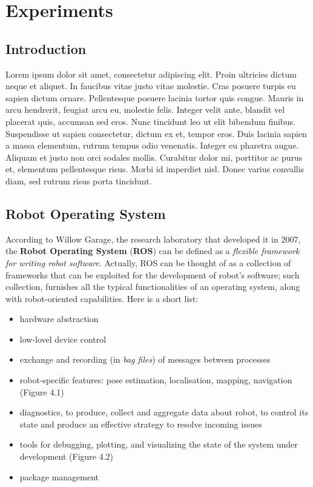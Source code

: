 \documentclass[a4paper, onecolumn]{report}
\begin{document}
\chapter{Experiments}
\section{Introduction}
Lorem ipsum dolor sit amet, consectetur adipiscing elit. Proin ultricies dictum neque et aliquet. In faucibus vitae justo vitae molestie. Cras posuere turpis eu sapien dictum ornare. Pellentesque posuere lacinia tortor quis congue. Mauris in arcu hendrerit, feugiat arcu eu, molestie felis. Integer velit ante, blandit vel placerat quis, accumsan sed eros. Nunc tincidunt leo ut elit bibendum finibus. Suspendisse ut sapien consectetur, dictum ex et, tempor eros. Duis lacinia sapien a massa elementum, rutrum tempus odio venenatis. Integer eu pharetra augue. Aliquam et justo non orci sodales mollis. Curabitur dolor mi, porttitor ac purus et, elementum pellentesque risus. Morbi id imperdiet nisl. Donec varius convallis diam, sed rutrum risus porta tincidunt. 

\section{Robot Operating System}
According to Willow Garage, the research laboratory that developed it in 2007, the \textbf{Robot Operating System} (\textbf{ROS}) can be defined as a \emph{flexible framework for writing robot software}. Actually, ROS can be thought of as a collection of frameworks that can be exploited for the development of robot's software; such collection, furnishes all the typical functionalities of an operating system,  along with robot-oriented capabilities. Here is a short list:
\begin{itemize}
	\item{hardware abstraction}
	\item{low-lovel device control}
	\item{exchange and recording (in \emph{bag files}) of messages between processes}
	\item{robot-specific features: pose estimation, localisation, mapping, navigation (Figure 4.1)}
	\item{diagnostics, to produce, collect and aggregate data about robot, to control its state and produce an effective strategy to resolve incoming issues}
	\item{tools for debugging, plotting, and visualizing the state of the system under development (Figure 4.2)}
	\item{package management}
\end{itemize}
\end{document}

